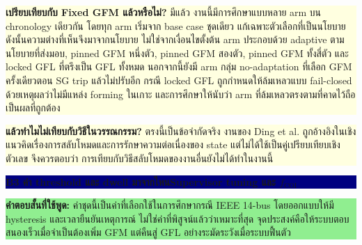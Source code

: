 \documentclass[12pt,a4paper]{article}
\newcommand{\sectitle}[2]{\noindent\colorbox{navy}{\parbox{\dimexpr\textwidth-2\fboxsep\relax}{\color{white}\Large\bfseries #1\hfill\normalsize #2}}\par\vspace{4pt}}
\newcommand{\answerbox}[1]{\noindent\colorbox{lightgreen}{\parbox{\dimexpr\textwidth-2\fboxsep\relax}{\textbf{คำตอบสั้นที่ใช้พูด:} #1}}}
\begin{document}
\vspace{4pt}
\noindent\colorbox{lightyellow}{\parbox{\dimexpr\textwidth-2\fboxsep\relax}{\small\textbf{เปรียบเทียบกับ Fixed GFM แล้วหรือไม่?} มีแล้ว งานนี้มีการศึกษาแบบหลาย arm บน chronology เดียวกัน โดยทุก arm เริ่มจาก base case ชุดเดียว แก้เฉพาะตัวเลือกที่เป็นนโยบาย ดังนั้นความต่างที่เห็นจึงมาจากนโยบาย ไม่ใช่จากเงื่อนไขตั้งต้น arm ประกอบด้วย adaptive ตามนโยบายที่ส่งมอบ, pinned GFM หนึ่งตัว, pinned GFM สองตัว, pinned GFM ทั้งสี่ตัว และ locked GFL ที่ตรึงเป็น GFL ทั้งหมด นอกจากนี้ยังมี arm กลุ่ม no-adaptation ที่เลือก GFM ครั้งเดียวตอน SG trip แล้วไม่ปรับอีก กรณี locked GFL ถูกกำหนดให้ล้มเหลวแบบ fail-closed ด้วยเหตุผลว่าไม่มีแหล่ง forming ในเกาะ และการศึกษาให้นับว่า arm ที่ล้มเหลวตรงตามที่คาดไว้ถือเป็นผลที่ถูกต้อง}}

\vspace{3pt}
\noindent\colorbox{lightyellow}{\parbox{\dimexpr\textwidth-2\fboxsep\relax}{\small\textbf{แล้วทำไมไม่เทียบกับวิธีในวรรณกรรม?} ตรงนี้เป็นข้อจำกัดจริง งานของ Ding et al. ถูกอ้างอิงในเชิงแนวคิดเรื่องการสลับโหมดและการรักษาความต่อเนื่องของ state แต่ไม่ได้ใช้เป็นคู่เปรียบเทียบเชิงตัวเลข จึงควรตอบว่า การเทียบกับวิธีสลับโหมดของงานอื่นยังไม่ได้ทำในงานนี้}}
\clearpage

\sectitle{B3 ค่า threshold และ dwell มาจากไหน}{Supervisor tuning และ $f_{\mathrm{COI}}$}

\answerbox{ค่าชุดนี้เป็นค่าที่เลือกใช้ในการศึกษากรณี IEEE 14-bus โดยออกแบบให้มี hysteresis และเวลายืนยันเหตุการณ์ ไม่ใช่ค่าที่พิสูจน์แล้วว่าเหมาะที่สุด จุดประสงค์คือให้ระบบตอบสนองเร็วเมื่อจำเป็นต้องเพิ่ม GFM แต่คืนสู่ GFL อย่างระมัดระวังเมื่อระบบฟื้นตัว}
\end{document}
